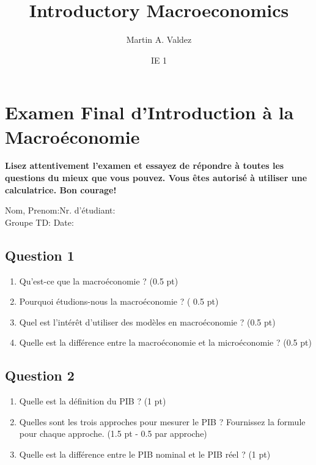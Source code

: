 \documentclass[11pt]{article}
\title{Introductory Macroeconomics}
\author{Martin A. Valdez}
\date{IE 1\\}
\begin{document}

\section*{Examen Final d'Introduction à la Macroéconomie}
\textbf{Lisez attentivement l'examen et essayez de répondre à toutes les questions du mieux que vous 
pouvez. 
Vous êtes autorisé à utiliser une calculatrice. Bon courage!}


\begin{flushleft}

Nom, Prenom:\underline{\hspace{5cm}}\hfil Nr. d'étudiant:\underline{\hspace{4cm}}\\
Groupe TD:\underline{\hspace{5cm}} \hfill Date:\underline{\hspace{5cm}}


\end{flushleft}
\subsection*{Question 1}

\begin{enumerate}
    \item Qu'est-ce que la macroéconomie ? (0.5 pt)
    \item Pourquoi étudions-nous la macroéconomie ? ( 0.5 pt)
    \item Quel est l'intérêt d'utiliser des modèles en macroéconomie ? (0.5 pt)
    \item Quelle est la différence entre la macroéconomie et la microéconomie ? (0.5 pt)
\end{enumerate}

\subsection*{Question 2}
\begin{enumerate}
    \item Quelle est la définition du PIB ? (1 pt)
    \item Quelles sont les trois approches pour mesurer le PIB ? Fournissez la formule pour chaque approche. (1.5 pt - 0.5 par approche)
    \item Quelle est la différence entre le PIB nominal et le PIB réel ? (1 pt)
\end{enumerate}
\end{document}
